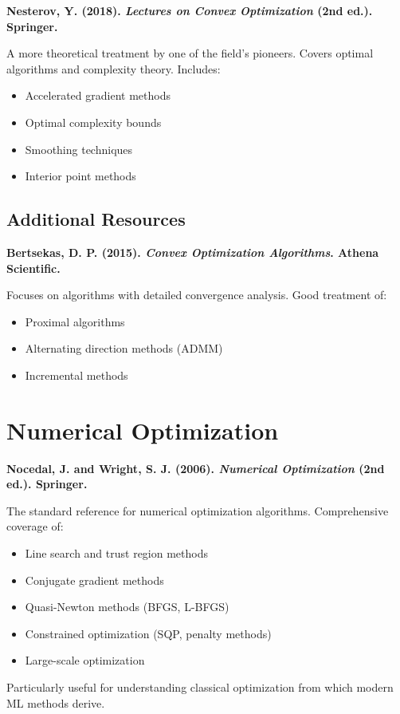 \documentclass[../main.tex]{subfiles}
\begin{document}
\textbf{Nesterov, Y. (2018). \emph{Lectures on Convex Optimization} (2nd ed.). Springer.}

A more theoretical treatment by one of the field's pioneers. Covers optimal algorithms and complexity theory. Includes:
\begin{itemize}
    \item Accelerated gradient methods
    \item Optimal complexity bounds
    \item Smoothing techniques
    \item Interior point methods
\end{itemize}

\subsection{Additional Resources}

\textbf{Bertsekas, D. P. (2015). \emph{Convex Optimization Algorithms}. Athena Scientific.}

Focuses on algorithms with detailed convergence analysis. Good treatment of:
\begin{itemize}
    \item Proximal algorithms
    \item Alternating direction methods (ADMM)
    \item Incremental methods
\end{itemize}

\section{Numerical Optimization}

\textbf{Nocedal, J. and Wright, S. J. (2006). \emph{Numerical Optimization} (2nd ed.). Springer.}

The standard reference for numerical optimization algorithms. Comprehensive coverage of:
\begin{itemize}
    \item Line search and trust region methods
    \item Conjugate gradient methods
    \item Quasi-Newton methods (BFGS, L-BFGS)
    \item Constrained optimization (SQP, penalty methods)
    \item Large-scale optimization
\end{itemize}
Particularly useful for understanding classical optimization from which modern ML methods derive.
\end{document}
